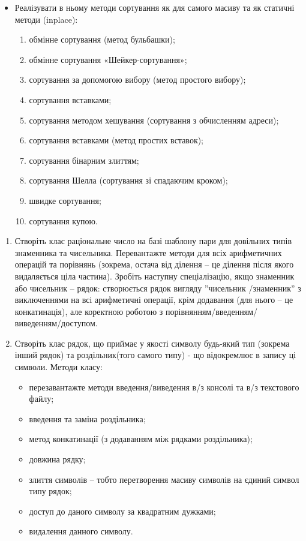\documentclass[]{article}
\begin{document}
\begin{itemize}
\item
  Реалізувати в ньому методи сортування як для самого масиву та як
  статичні методи (inplace):

  \begin{enumerate}
  \def\labelenumi{\arabic{enumi}.}
  \item
    обмінне сортування (метод бульбашки);
  \item
    обмінне сортування «Шейкер-сортування»;
  \item
    сортування за допомогою вибору (метод простого вибору);
  \item
    сортування вставками;
  \item
    сортування методом хешування (сортування з обчисленням адреси);
  \item
    сортування вставками (метод простих вставок);
  \item
    сортування бінарним злиттям;
  \item
    сортування Шелла (сортування зі спадаючим кроком);
  \item
    швидке сортування;
  \item
    сортування купою.
  \end{enumerate}
\end{itemize}

\begin{enumerate}
\def\labelenumi{\arabic{enumi}.}
\item
  Створіть клас раціональне число на базі шаблону пари для довільних
  типів знаменника та чисельника. Перевантажте методи для всіх
  арифметичних операцій та порівнянь (зокрема, остача від ділення -- це
  ділення після якого видаляється ціла частина). Зробіть наступну
  спеціалізацію, якщо знаменник або чисельник -- рядок: створюється
  рядок вигляду ''чисельник /знаменник'' з виключеннями на всі
  арифметичні операції, крім додавання (для нього -- це конкатинація),
  але коректною роботою з порівнянням/введенням/виведенням/доступом.
\item
  Створіть клас рядок, що приймає у якості символу будь-який тип
  (зокрема інший рядок) та роздільник(того самого типу) - що відокремлює
  в запису ці символи. Методи класу:

  \begin{itemize}
  \item
    перезавантажте методи введення/виведення в/з консолі та в/з
    текстового файлу;
  \item
    введення та заміна роздільника;
  \item
    метод конкатинації (з додаванням між рядками роздільника);
  \item
    довжина рядку;
  \item
    злиття символів -- тобто перетворення масиву символів на єдиний
    символ типу рядок;
  \item
    доступ до даного символу за квадратним дужками;
  \item
    видалення данного символу.
  \end{itemize}
\end{enumerate}
\end{document}
